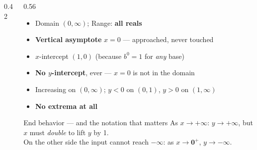 \documentclass[aspectratio=169, 11pt]{beamer}
\newcommand{\lgrid}[4]{%
  \draw[step=1, linegray!45, thin] (#1,#3) grid (#2,#4);
  \draw[->, thick, charcoal] (#1,0)--(#2,0) node[below right, font=\tiny]{$x$};
  \draw[->, thick, charcoal] (0,#3)--(0,#4) node[left, font=\tiny]{$y$};}
\newcommand{\logcurve}[5]{\draw[very thick, forest, domain=#4:#5, samples=120, smooth]
  plot ({pow(#1,\x-(#3))+(#2)},{\x});}
\begin{document}
\begin{frame}[t, plain]
  \begin{columns}[T]
    \begin{column}{0.42\textwidth}
      \centering
    \end{column}
    \begin{column}{0.56\textwidth}
      \footnotesize
      \begin{itemize}\setlength{\itemsep}{3pt}
        \item Domain $(0,\infty)$; \; Range: \textbf{all reals}
        \item \textbf{Vertical asymptote} $x=0$ --- approached, never touched
        \item $x$-intercept $(1,0)$ \; (because $b^0=1$ for \emph{any} base)
        \item \textbf{No $y$-intercept}, ever --- $x=0$ is not in the domain
        \item Increasing on $(0,\infty)$; \; $y<0$ on $(0,1)$, $y>0$ on $(1,\infty)$
        \item \textbf{No extrema at all}
      \end{itemize}
      \vspace{2pt}
      \begin{block}{End behavior --- and the notation that matters}
        As $x\to+\infty$: $y\to+\infty$, but $x$ must \emph{double} to lift $y$ by 1. \\[3pt]
        On the other side the input cannot reach $-\infty$: as $x\to \mathbf{0^{+}}$,
        $y\to-\infty$.
      \end{block}
    \end{column}
  \end{columns}
\end{frame}
\end{document}
